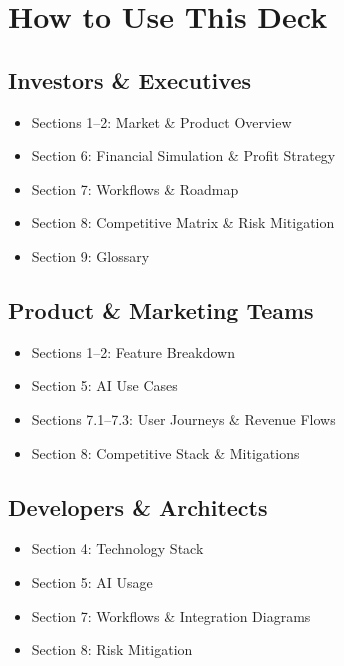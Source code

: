 \documentclass[13pt]{extarticle}
\begin{document}
\newpage
\section*{How to Use This Deck}

\vspace{1em}

\subsection*{Investors \& Executives}
\begin{itemize}[leftmargin=2em,noitemsep]
  \item Sections 1–2: Market \& Product Overview
  \item Section 6: Financial Simulation \& Profit Strategy
  \item Section 7: Workflows \& Roadmap
  \item Section 8: Competitive Matrix \& Risk Mitigation
  \item Section 9: Glossary
\end{itemize}

\subsection*{Product \& Marketing Teams}
\begin{itemize}[leftmargin=2em,noitemsep]
  \item Sections 1–2: Feature Breakdown
  \item Section 5: AI Use Cases
  \item Sections 7.1–7.3: User Journeys \& Revenue Flows
  \item Section 8: Competitive Stack \& Mitigations
\end{itemize}

\subsection*{Developers \& Architects}
\begin{itemize}[leftmargin=2em,noitemsep]
  \item Section 4: Technology Stack
  \item Section 5: AI Usage
  \item Section 7: Workflows \& Integration Diagrams
  \item Section 8: Risk Mitigation
\end{itemize}
\end{document}
